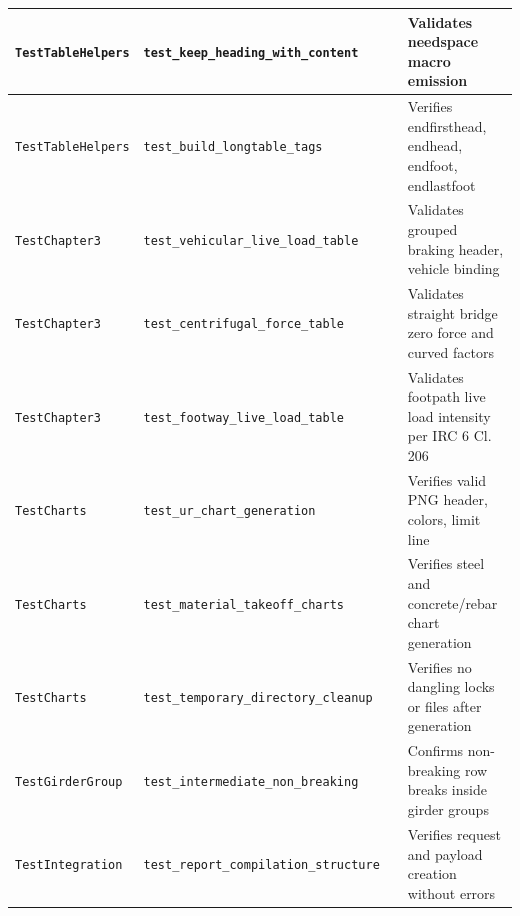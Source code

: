 \documentclass[12pt,a4paper]{article}
\begin{document}
\begin{table}[H]
\begin{tabularx}{\textwidth}{|p{3.4cm}|p{5.2cm}|c|X|}
    \hline
    \rowcolor{OsdagZebra}
    \texttt{TestTableHelpers} & \nolinkurl{test_keep_heading_with_content} & \textbf{\color{OsdagPass}{PASS}} & Validates needspace macro emission \\
    \hline
    \texttt{TestTableHelpers} & \nolinkurl{test_build_longtable_tags} & \textbf{\color{OsdagPass}{PASS}} & Verifies endfirsthead, endhead, endfoot, endlastfoot \\
    \hline
    \rowcolor{OsdagZebra}
    \texttt{TestChapter3} & \nolinkurl{test_vehicular_live_load_table} & \textbf{\color{OsdagPass}{PASS}} & Validates grouped braking header, vehicle binding \\
    \hline
    \texttt{TestChapter3} & \nolinkurl{test_centrifugal_force_table} & \textbf{\color{OsdagPass}{PASS}} & Validates straight bridge zero force and curved factors \\
    \hline
    \rowcolor{OsdagZebra}
    \texttt{TestChapter3} & \nolinkurl{test_footway_live_load_table} & \textbf{\color{OsdagPass}{PASS}} & Validates footpath live load intensity per IRC 6 Cl. 206 \\
    \hline
    \texttt{TestCharts} & \nolinkurl{test_ur_chart_generation} & \textbf{\color{OsdagPass}{PASS}} & Verifies valid PNG header, colors, limit line \\
    \hline
    \rowcolor{OsdagZebra}
    \texttt{TestCharts} & \nolinkurl{test_material_takeoff_charts} & \textbf{\color{OsdagPass}{PASS}} & Verifies steel and concrete/rebar chart generation \\
    \hline
    \texttt{TestCharts} & \nolinkurl{test_temporary_directory_cleanup} & \textbf{\color{OsdagPass}{PASS}} & Verifies no dangling locks or files after generation \\
    \hline
    \rowcolor{OsdagZebra}
    \texttt{TestGirderGroup} & \nolinkurl{test_intermediate_non_breaking} & \textbf{\color{OsdagPass}{PASS}} & Confirms non-breaking row breaks inside girder groups \\
    \hline
    \texttt{TestIntegration} & \nolinkurl{test_report_compilation_structure} & \textbf{\color{OsdagPass}{PASS}} & Verifies request and payload creation without errors \\
    \hline
  \end{tabularx}
\end{table}
\endgroup

\newpage

\end{document}
